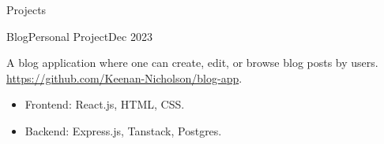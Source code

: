 \documentclass[]{Keenan-Nicholson-Resume}
\begin{document}
\begin{section}{Projects}

\begin{subsectionnobullet}{Blog}{Personal Project}{Dec 2023}{}
    \item{A blog application where one can create, edit, or browse blog posts by users. \href{https://github.com/Keenan-Nicholson/blog-app}{https://github.com/Keenan-Nicholson/blog-app}.}
            \vspace{-4pt}
        \begin{itemize}[itemsep=-6.5pt]
            \item Frontend: React.js, HTML, CSS.
            \item Backend: Express.js, Tanstack, Postgres.
        \end{itemize}
\end{subsectionnobullet}

\end{section}

\end{document}
